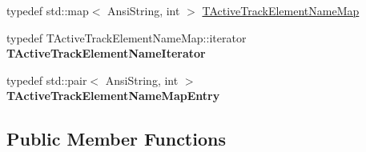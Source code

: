 \begin{DoxyCompactItemize}
\item 
typedef std\+::map$<$ Ansi\+String, int $>$ \mbox{\hyperlink{class_t_track_af78e1d88c49cebd05b35fc408a5d9d2e}{T\+Active\+Track\+Element\+Name\+Map}}
\item 
\mbox{\label{class_t_track_acb3e8471adea42d0882a260e80e33b21}} 
typedef T\+Active\+Track\+Element\+Name\+Map\+::iterator {\bfseries T\+Active\+Track\+Element\+Name\+Iterator}
\item 
\mbox{\label{class_t_track_ac63bcf12fb8b775e0ba691b85cc3515b}} 
typedef std\+::pair$<$ Ansi\+String, int $>$ {\bfseries T\+Active\+Track\+Element\+Name\+Map\+Entry}
\end{DoxyCompactItemize}
\subsection*{Public Member Functions}
